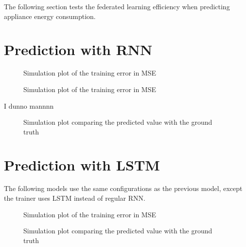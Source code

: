 \documentclass[a4paper, article, oneside, USenglish, IN5460]{memoir}
\begin{document}
The following section tests the federated learning efficiency when predicting appliance energy consumption.

\section{Prediction with RNN}

\begin{figure}[H]
  \centering
    
  \caption{Simulation plot of the training error in MSE}
\end{figure}

\begin{figure}[H]
  \centering
    
  \caption{Simulation plot of the training error in MSE}
\end{figure}

I dunno mannnn

\begin{figure}[H]
  \centering
    
  \caption{Simulation plot comparing the predicted value with the ground truth}
\end{figure}




\section{Prediction with LSTM}

The following models use the same configurations as the previous model, except the trainer uses LSTM instead of regular RNN.

\begin{figure}[H]
  \centering
    
  \caption{Simulation plot of the training error in MSE}
\end{figure}


\begin{figure}[H]
  \centering
    
  \caption{Simulation plot comparing the predicted value with the ground truth}
\end{figure}

\end{document}
